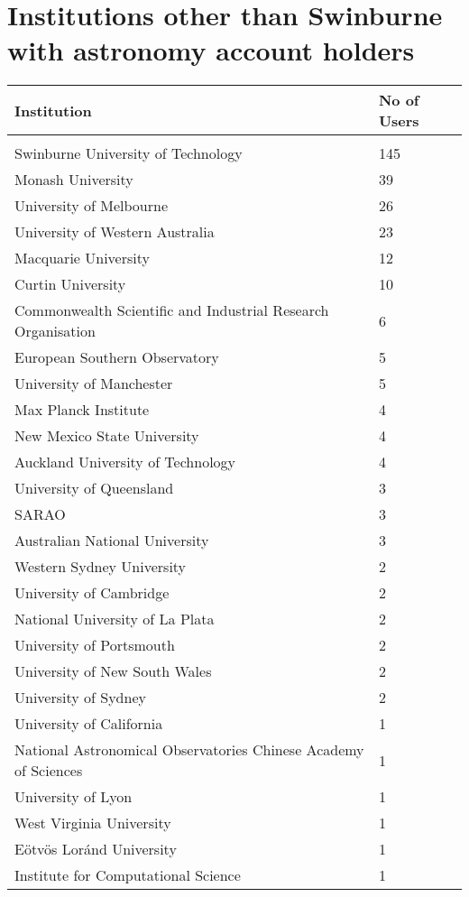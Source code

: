 \documentclass{article}%
\begin{document}
\section{Institutions other than Swinburne with astronomy account holders}%

%
\begin{longtabu}{X[l] X[r]}%
\textbf{Institution}&\textbf{No of Users}\\%
\hline%
&\\%
Swinburne University of Technology&145\\%
\hline%
Monash University&39\\%
\hline%
University of Melbourne&26\\%
\hline%
University of Western Australia&23\\%
\hline%
Macquarie University&12\\%
\hline%
Curtin University&10\\%
\hline%
Commonwealth Scientific and Industrial Research Organisation&6\\%
\hline%
European Southern Observatory&5\\%
\hline%
University of Manchester&5\\%
\hline%
Max Planck Institute&4\\%
\hline%
New Mexico State University&4\\%
\hline%
Auckland University of Technology&4\\%
\hline%
University of Queensland&3\\%
\hline%
SARAO&3\\%
\hline%
Australian National University&3\\%
\hline%
Western Sydney University&2\\%
\hline%
University of Cambridge&2\\%
\hline%
National University of La Plata&2\\%
\hline%
University of Portsmouth&2\\%
\hline%
University of New South Wales&2\\%
\hline%
University of Sydney&2\\%
\hline%
University of California&1\\%
\hline%
National Astronomical Observatories Chinese Academy of Sciences&1\\%
\hline%
University of Lyon&1\\%
\hline%
West Virginia University&1\\%
\hline%
Eötvös Loránd University&1\\%
\hline%
Institute for Computational Science&1\\%

\end{longtabu}
\end{document}

